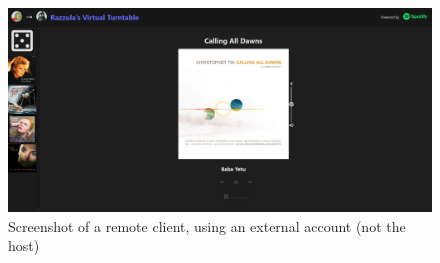 \begin{uomappendix}
            \begin{figure}[H]
                \centering
                \begin{minipage}[b]{0.45\textwidth}
                    \centering
                    \includegraphics[width=\textwidth]{images/screenshots/LAPTOP_External.png}
                    \caption{Screenshot of a remote client, using an external account (not the host)}
                    \label{fig:laptopExternal}
                \end{minipage}
            \end{figure}
            

\end{uomappendix}
